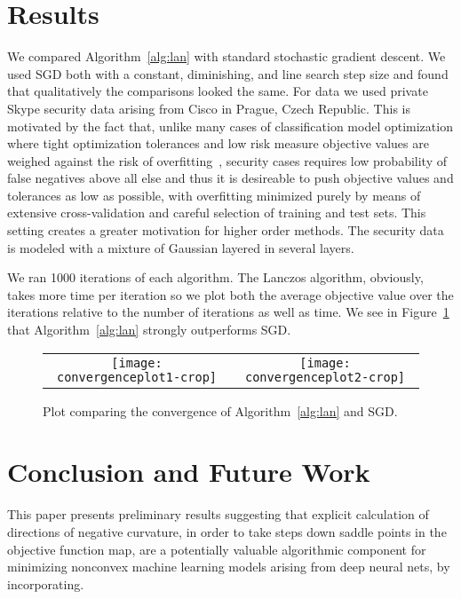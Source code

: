 \documentclass[psamsfonts,onesided,10pt]{amsart}
\theoremstyle{definition}
\theoremstyle{remark}
\numberwithin{equation}{section}
\begin{document}
\section{Results}
We compared Algorithm~\ref{alg:lan} with standard stochastic gradient descent. We used SGD both with a constant, diminishing, and line search step size
and found that qualitatively the comparisons looked the same. For data we used private Skype security data arising from Cisco in Prague, Czech Republic. 
This is motivated by the fact that,
unlike many cases of classification model optimization where tight optimization tolerances and low risk measure objective values are weighed against the risk of 
overfitting~\cite{bousquet2008tradeoffs}, security cases requires low probability of false negatives above all else and thus it is desireable to push
objective values and tolerances as low as possible, with overfitting minimized purely by means of extensive cross-validation and careful selection 
of training and test sets. This setting creates a greater motivation for higher order methods. The security data is modeled with a mixture of Gaussian
layered in several layers.

We ran 1000 iterations of each algorithm. The Lanczos algorithm, obviously, takes more time per iteration so we plot both the average objective
value over the iterations relative to the number of iterations as well as time. We see in Figure~\ref{fig-convplot} that Algorithm~\ref{alg:lan}
strongly outperforms SGD.

\begin{figure}
\caption{\label{fig-convplot} Plot comparing the convergence of Algorithm~\ref{alg:lan} and SGD.}
\begin{center}
\begin{tabular}{c c} 
\texttt{[image: convergenceplot1-crop]}
&
\texttt{[image: convergenceplot2-crop]}
\end{tabular}
\end{center}
\end{figure}

\section{Conclusion and Future Work}
This paper presents preliminary results suggesting that explicit calculation of directions of negative curvature, in order to take steps
down saddle points in the objective function map, are a potentially valuable algorithmic component for minimizing nonconvex machine learning
models arising from deep neural nets, by incorporating.
\end{document}
